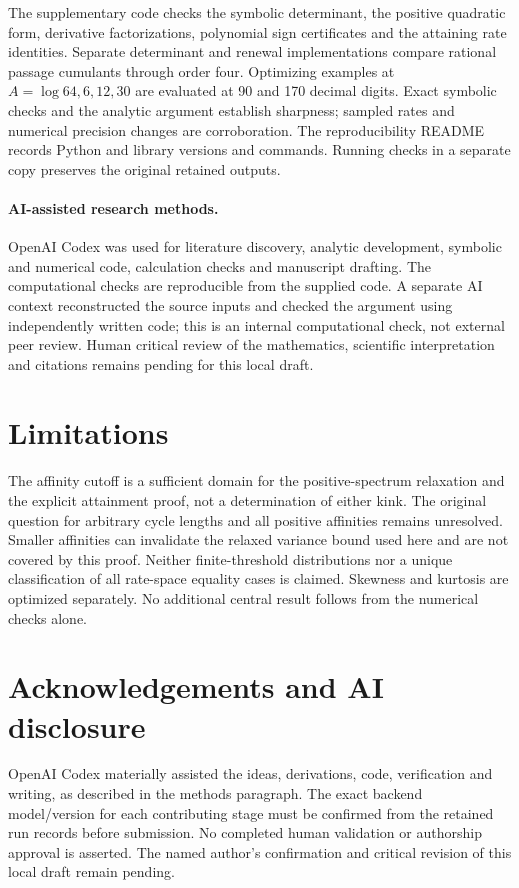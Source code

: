 \documentclass[11pt,a4paper]{article}
\begin{document}
The supplementary code checks the symbolic determinant, the positive quadratic form, derivative factorizations, polynomial sign certificates and the attaining rate identities. Separate determinant and renewal implementations compare rational passage cumulants through order four. Optimizing examples at $A=\log64,6,12,30$ are evaluated at 90 and 170 decimal digits. Exact symbolic checks and the analytic argument establish sharpness; sampled rates and numerical precision changes are corroboration. The reproducibility README records Python and library versions and commands. Running checks in a separate copy preserves the original retained outputs.

\paragraph{AI-assisted research methods.}
OpenAI Codex was used for literature discovery, analytic development, symbolic and numerical code, calculation checks and manuscript drafting. The computational checks are reproducible from the supplied code. A separate AI context reconstructed the source inputs and checked the argument using independently written code; this is an internal computational check, not external peer review. Human critical review of the mathematics, scientific interpretation and citations remains pending for this local draft.

\section{Limitations}
The affinity cutoff is a sufficient domain for the positive-spectrum relaxation and the explicit attainment proof, not a determination of either kink. The original question for arbitrary cycle lengths and all positive affinities remains unresolved. Smaller affinities can invalidate the relaxed variance bound used here and are not covered by this proof. Neither finite-threshold distributions nor a unique classification of all rate-space equality cases is claimed. Skewness and kurtosis are optimized separately. No additional central result follows from the numerical checks alone.

\section*{Acknowledgements and AI disclosure}
OpenAI Codex materially assisted the ideas, derivations, code, verification and writing, as described in the methods paragraph. The exact backend model/version for each contributing stage must be confirmed from the retained run records before submission. No completed human validation or authorship approval is asserted. The named author's confirmation and critical revision of this local draft remain pending.
\end{document}
